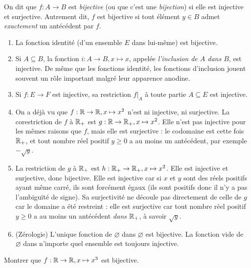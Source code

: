 \begin{definition}
On dit que $f : A\to B$ est \emph{bijective} (ou que c'est une \emph{bijection}) si elle est injective et surjective. Autrement dit, $f$ est bijective si tout élément $y\in B$ admet \emph{exactement} un antécédent par $f$.
\end{definition}

\begin{exemple}
\begin{enumerate}
\item La fonction identité (d'un ensemble $E$ dans lui-même) est bijective.
\item Si $A\subseteq B$, la fonction $i : A\to B, x\mapsto x$, appelée \emph{l'inclusion de $A$ dans $B$}, est injective. De même que les fonctions identité, les fonctions d'inclusion jouent souvent un rôle important malgré leur apparence anodine.
\item Si $f : E\to F$ est injective, sa restriction $f|_A$ à toute partie $A\subseteq E$ est injective.
\item On a déjà vu que $f : \mathbb{R} \to \mathbb{R}, x\mapsto x^2$ n'est ni injective, ni surjective. La corestriction de $f$ à $\mathbb{R}_+$ est $g : \mathbb{R} \to \mathbb{R}_+, x\mapsto x^2$. Elle n'est pas injective pour les mêmes raisons que $f$, mais elle est surjective : le codomaine est cette fois $\mathbb{R}_+$, et tout nombre réel positif $y\geq 0$ a au moins un antécédent, par exemple $-\sqrt{y}$.
\item La restriction de $g$ à $\mathbb{R}_+$ est $h : \mathbb{R}_+ \to \mathbb{R}_+, x\mapsto x^2$. Elle est injective et surjective, donc bijective. Elle est injective car si $x$ et $y$ sont des réels positifs ayant même carré, ils sont forcément égaux (ils sont positifs donc il n'y a pas l'ambiguïté de signe). Sa surjectivité ne découle pas directement de celle de $g$ car le domaine a été restreint : elle est surjective car tout nombre réel positif $y\geq 0$ a au moins un antécédent \emph{dans $\mathbb{R}_+$}, à savoir $\sqrt{y}$.
\item (Zérologie) L'unique fonction de $\varnothing$ dans $\varnothing$ est bijective. La fonction vide de $\varnothing$ dans n'importe quel ensemble est toujours injective.
\end{enumerate}
\end{exemple}

\begin{exercice}
Montrer que  $f: \mathbb{R}\to \mathbb{R}, x\mapsto x^3$ est bijective.
\end{exercice}

